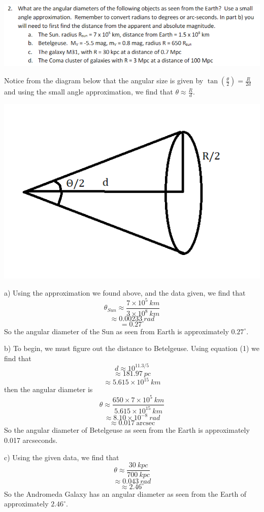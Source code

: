 \documentclass{article}
\begin{document}
\includegraphics[scale = 0.8]{probset7prob2.PNG}

Notice from the diagram below that the angular size is given by $\tan{(\frac{\theta}{2})} = \frac{R}{2d}$ and using the small angle approximation, we find that $\theta \approx \frac{R}{d}$.
\begin{center}
    \includegraphics[scale = 0.8]{angular size.PNG}
\end{center}

a) Using the approximation we found above, and the data given, we find that
\[\theta_{Sun} \approx \frac{7 \times 10^5 \: km}{3 \times 10^8 \: km}\]
\[\approx 0.00233 \:rad\]
\[ = 0.27^{\circ}\]
So the angular diameter of the Sun as seen from Earth is approximately $0.27^{\circ}$.

b) To begin, we must figure out the distance to Betelgeuse. Using equation (1) we find that
\[d \approx 10^{11.3/5}\]
\[\approx 181.97 \:pc\]
\[\approx 5.615 \times 10^{15} \: km\]
then the angular diameter is 
\[\theta \approx \frac{650 \times 7 \times 10^5 \: km}{5.615 \times 10^{15} \:km}\]
\[\approx 8.10 \times 10^{-8} \: rad\]
\[\approx 0.017 \:\text{arcsec}\]
So the angular diameter of Betelgeuse as seen from the Earth is approximately 0.017 arcseconds.

c) Using the given data, we find that 
\[\theta \approx \frac{30 \: kpc}{700 \: kpc}\]
\[\approx 0.043 \:rad\]
\[\approx 2.46^{\circ}\]
So the Andromeda Galaxy has an angular diameter as seen from the Earth of approximately $2.46^{\circ}$.
\end{document}
